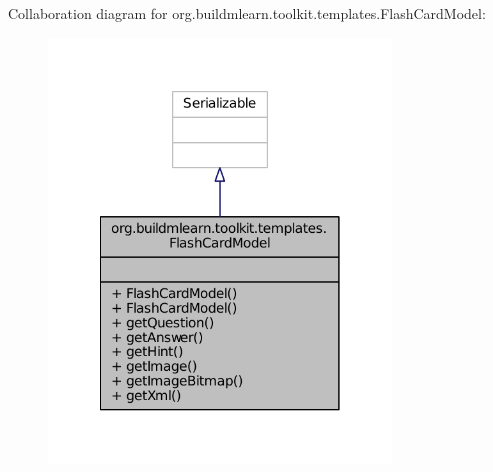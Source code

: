 Collaboration diagram for org.\-buildmlearn.\-toolkit.\-templates.\-Flash\-Card\-Model\-:
\nopagebreak
\begin{figure}[H]
\begin{center}
\leavevmode
\includegraphics[width=258pt]{d6/da7/classorg_1_1buildmlearn_1_1toolkit_1_1templates_1_1FlashCardModel__coll__graph}
\end{center}
\end{figure}
